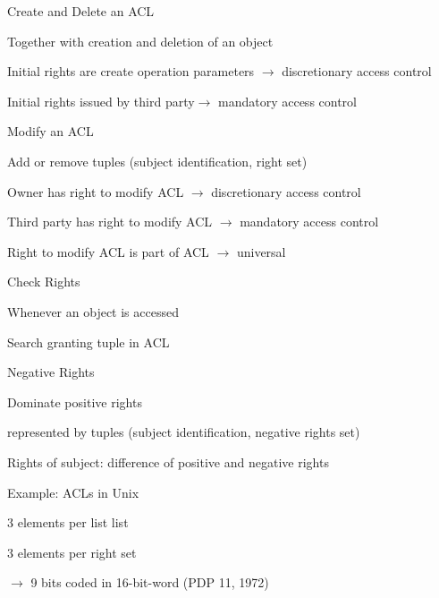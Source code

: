 \documentclass[a4paper]{article}
\begin{document}
\begin{multicols}{3}
    Create and Delete an ACL
    \begin{itemize*}
        \item Together with creation and deletion of an object
        \item Initial rights are create operation parameters $\rightarrow$ discretionary access control
        \item Initial rights issued by third party$\rightarrow$ mandatory access control
    \end{itemize*}

    Modify an ACL
    \begin{itemize*}
        \item Add or remove tuples (subject identification, right set)
        \item Owner has right to modify ACL $\rightarrow$ discretionary access control
        \item Third party has right to modify ACL $\rightarrow$ mandatory access control
        \item Right to modify ACL is part of ACL $\rightarrow$ universal
    \end{itemize*}

    Check Rights
    \begin{itemize*}
        \item Whenever an object is accessed
        \item Search granting tuple in ACL
    \end{itemize*}

    Negative Rights
    \begin{itemize*}
        \item Dominate positive rights
        \item represented by tuples (subject identification, negative rights set)
        \item Rights of subject: difference of positive and negative rights
    \end{itemize*}

    \begin{multicols}{2}
    Example: ACLs in Unix
    \begin{itemize*}
        \item 3 elements per list list
        \item 3 elements per right set
        \item[$\rightarrow$] 9 bits coded in 16-bit-word (PDP 11, 1972)
    \end{itemize*}
\columnbreak


\end{multicols}
\end{multicols}
\end{document}
